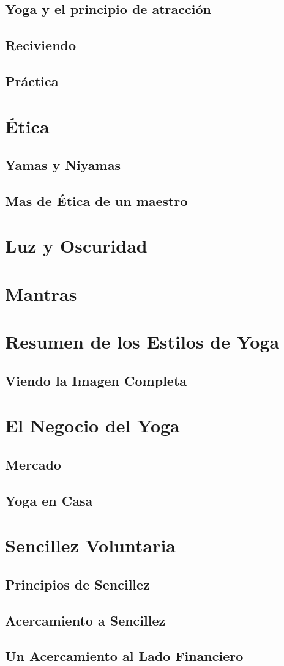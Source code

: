 \subsection{Yoga y el principio de atracción}
\subsection{Reciviendo}
\subsection{Práctica}
\section{Ética}
\subsection{Yamas y Niyamas}
\subsection{Mas de Ética de un maestro}
\section{Luz y Oscuridad}
\section{Mantras}
\section{Resumen de los Estilos de Yoga}
\subsection{Viendo la Imagen Completa}
\section{El Negocio del Yoga}
\subsection{Mercado}
\subsection{Yoga en Casa}
\section{Sencillez Voluntaria}
\subsection{Principios de Sencillez}
\subsection{Acercamiento a Sencillez}
\subsection{Un Acercamiento al Lado Financiero}


